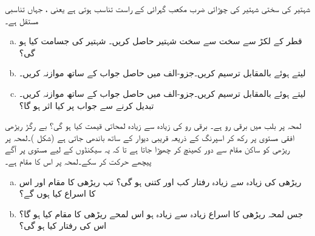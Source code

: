 \quad
شہتیر کی سختی   شہتیر  کی چوڑائی  ضرب مکعب گہرائی  کے راست تناسب ہوتی ہے یعنی ،  جہاں  تناسبی مستقل ہے۔ 
\begin{enumerate}[a.]
\item
{} قطر کے لکڑ سے سخت سے سخت شہتیر حاصل کریں۔ شہتیر کی جسامت کیا ہو گی؟
\item
{} لیتے ہوئے  بالمقابل  ترسیم کریں۔جزو-الف میں حاصل جواب کے ساتھ موازنہ کریں۔
\item
{} لیتے ہوئے  بالمقابل  ترسیم کریں۔جزو-الف میں حاصل جواب کے ساتھ موازنہ کریں۔  تبدیل کرنے سے جواب پر کیا اثر ہو گا؟
\end{enumerate}
لمحہ  پر  بلب میں برقی رو  ہے۔ برقی رو کی زیادہ سے زیادہ لمحاتی قیمت کیا ہو گی؟
بے رگڑ ریڑھی افقی مستوی پر رکھ کر اسپرنگ کے ذریعہ قریبی دیوار کے ساتھ باندھی  جاتی ہے (شکل )۔لمحہ  پر   ریڑھی  کو  ساکن مقام سے دور کھینچ کر چھوڑا جاتا ہے تا کہ یہ  سیکنڈوں کے لیے مستوی پر آگے پیچھے حرکت کر سکے۔لمحہ  پر اس کا مقام  ہے۔
\begin{enumerate}[a.]
\item
ریڑھی کی زیادہ سے زیادہ رفتار کب اور  کتنی ہو گی؟ تب ریڑھی کا مقام اور اس کا  اسراع  کیا ہوں گے؟
\item
جس لمحہ ریڑھی کا  اسراع زیادہ سے زیادہ ہو اس لمحے  ریڑھی کا مقام کیا ہو گا؟  اس کی رفتار کیا ہو گی؟ 
\end{enumerate}
